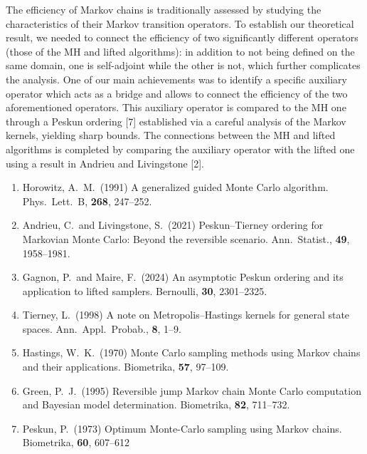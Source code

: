 \begin{talk}
The efficiency of Markov chains is traditionally assessed by studying the characteristics of their Markov transition operators. To establish our theoretical result, we needed to connect the efficiency of two significantly different operators (those of the MH and lifted algorithms): in addition to not being defined on the same domain, one is self-adjoint while the other is not, which further complicates the analysis. One of our main achievements was to identify a specific auxiliary operator which acts as a bridge and allows to connect the efficiency of the two aforementioned operators. This auxiliary operator is compared to the MH one through a Peskun ordering [7] established via a careful analysis of the Markov kernels, yielding sharp bounds. The connections between the MH and lifted algorithms is completed by comparing the auxiliary operator with the lifted one using a result in Andrieu and Livingstone [2].

\medskip

\begin{enumerate}
 \item[{[1]}] Horowitz, A.\ M.\ (1991) A generalized guided Monte Carlo algorithm. Phys.\ Lett.\ B, \textbf{268}, 247--252.
 \item[{[2]}] Andrieu, C.\ and Livingstone, S.\ (2021) Peskun--Tierney ordering for Markovian Monte Carlo: Beyond the reversible scenario. Ann.\ Statist., \textbf{49}, 1958--1981.
    \item[{[3]}] Gagnon, P.\ and Maire, F.\ (2024) An asymptotic Peskun ordering and its application to lifted samplers. Bernoulli, \textbf{30}, 2301--2325.
    \item[{[4]}] Tierney, L.\ (1998) A note on Metropolis--Hastings kernels for general state spaces. Ann.\ Appl.\ Probab., \textbf{8}, 1--9.
    \item[{[5]}] Hastings, W.\ K.\ (1970) Monte Carlo sampling methods using Markov chains and their applications. Biometrika, \textbf{57}, 97--109.
    \item[{[6]}] Green, P.\ J.\ (1995) Reversible jump Markov chain Monte Carlo computation and Bayesian model determination. Biometrika, \textbf{82}, 711--732.
    \item[{[7]}] Peskun, P.\ (1973) Optimum Monte-Carlo sampling using Markov chains. Biometrika, \textbf{60}, 607--612
\end{enumerate}


\end{talk}


